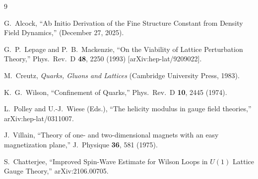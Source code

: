 \documentclass[11pt]{article}
\begin{document}
\begin{thebibliography}{9}

G.~Alcock,
``Ab Initio Derivation of the Fine Structure Constant from Density Field Dynamics,''
(December 27, 2025).

G.~P.~Lepage and P.~B.~Mackenzie,
``On the Viability of Lattice Perturbation Theory,''
Phys.\ Rev.\ D \textbf{48}, 2250 (1993)
[arXiv:hep-lat/9209022].

M.~Creutz,
\emph{Quarks, Gluons and Lattices}
(Cambridge University Press, 1983).

K.~G.~Wilson,
``Confinement of Quarks,''
Phys.\ Rev.\ D \textbf{10}, 2445 (1974).

L.~Polley and U.-J.~Wiese (Eds.),
``The helicity modulus in gauge field theories,''
arXiv:hep-lat/0311007.

J.~Villain,
``Theory of one- and two-dimensional magnets with an easy
magnetization plane,''
J.\ Physique \textbf{36}, 581 (1975).

S.~Chatterjee,
``Improved Spin-Wave Estimate for Wilson Loops in $U(1)$ Lattice Gauge Theory,''
arXiv:2106.00705.

\end{thebibliography}
\end{document}
